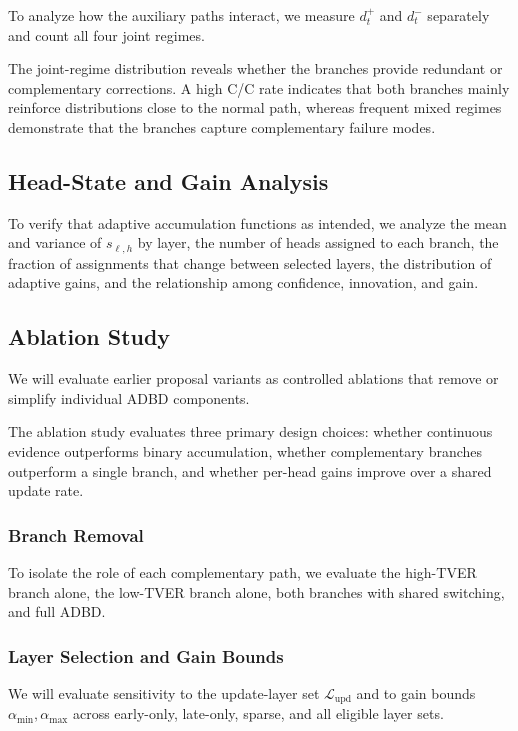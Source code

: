 To analyze how the auxiliary paths interact, we measure $d_t^{+}$ and $d_t^{-}$ separately and count all four joint regimes.

The joint-regime distribution reveals whether the branches provide redundant or complementary corrections. A high C/C rate indicates that both branches mainly reinforce distributions close to the normal path, whereas frequent mixed regimes demonstrate that the branches capture complementary failure modes.

\subsection{Head-State and Gain Analysis}

To verify that adaptive accumulation functions as intended, we analyze the mean and variance of $s_{\ell,h}$ by layer, the number of heads assigned to each branch, the fraction of assignments that change between selected layers, the distribution of adaptive gains, and the relationship among confidence, innovation, and gain.

\subsection{Ablation Study}
\label{subsec:ablations}

We will evaluate earlier proposal variants as controlled ablations that remove or simplify individual ADBD components.

The ablation study evaluates three primary design choices: whether continuous evidence outperforms binary accumulation, whether complementary branches outperform a single branch, and whether per-head gains improve over a shared update rate.

\subsubsection{Branch Removal}

To isolate the role of each complementary path, we evaluate the high-TVER branch alone, the low-TVER branch alone, both branches with shared switching, and full ADBD.

\subsubsection{Layer Selection and Gain Bounds}

We will evaluate sensitivity to the update-layer set $\mathcal{L}_{\mathrm{upd}}$ and to gain bounds $\alpha_{\min},\alpha_{\max}$ across early-only, late-only, sparse, and all eligible layer sets.

